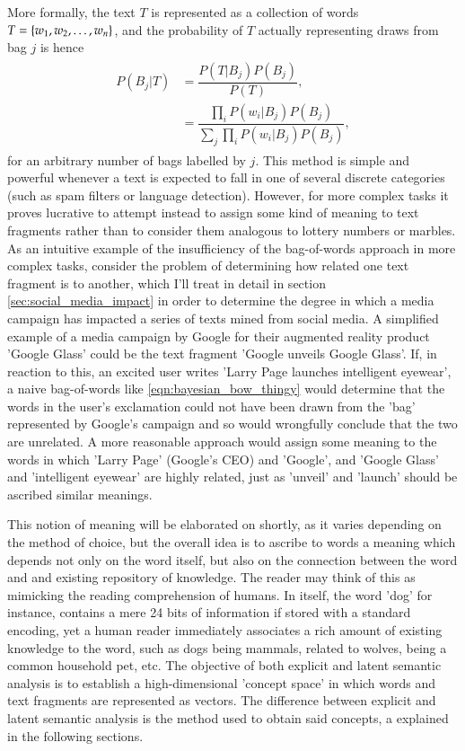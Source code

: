 More formally, the text $T$ is represented as a collection of words $T = \left\{ w_1, w_2, \ldots, w_n \right\}$, and the probability of  $T$ actually representing draws from bag $j$ is hence
\begin{align}
\begin{split}
		P(B_j|T) &= \dfrac{P(T|B_j)P(B_j)}{P(T)}, \\
		&= \dfrac{\prod_i P(w_i|B_j)P(B_j)}{\sum_j\prod_i P(w_i|B_j)P(B_j)}, \label{eqn:bayesian_bow_thingy}
\end{split}
\end{align}
for an arbitrary number of bags labelled by $j$. This method is simple and powerful whenever a text is expected to fall in one of several discrete categories (such as spam filters or language detection). However, for more complex tasks it proves lucrative to attempt instead to assign some kind of meaning to text fragments rather than to consider them analogous to lottery numbers or marbles. As an intuitive example of the insufficiency of the bag-of-words approach in more complex tasks, consider the problem of determining how related one text fragment is to another, which I'll treat in detail in section \ref{sec:social_media_impact} in order to determine the degree in which a media campaign has impacted a series of texts mined from social media. A simplified example of a media campaign by Google for their augmented reality product 'Google Glass' could be the text fragment 'Google unveils Google Glass'. If, in reaction to this, an excited user writes 'Larry Page launches intelligent eyewear', a naive bag-of-words like \eqref{eqn:bayesian_bow_thingy} would determine that the words in the user's exclamation could not have been drawn from the 'bag' represented by Google's campaign and so would wrongfully conclude that the two are unrelated. A more reasonable approach would assign some meaning to the words in which 'Larry Page' (Google's CEO) and 'Google', and 'Google Glass' and 'intelligent eyewear' are highly related, just as 'unveil' and 'launch' should be ascribed similar meanings.

This notion of meaning will be elaborated on shortly, as it varies depending on the method of choice, but the overall idea is to ascribe to words a meaning which depends not only on the word itself, but also on the connection between the word and and existing repository of knowledge. The reader may think of this as mimicking the reading comprehension of humans. In itself, the word 'dog' for instance, contains a mere 24 bits of information if stored with a standard encoding, yet a human reader immediately associates a rich amount of existing knowledge to the word, such as dogs being mammals, related to wolves, being a common household pet, etc. The objective of both explicit and latent semantic analysis is to establish a high-dimensional 'concept space' in which words and text fragments are represented as vectors. The difference between explicit and latent semantic analysis is the method used to obtain said concepts, a explained in the following sections.

